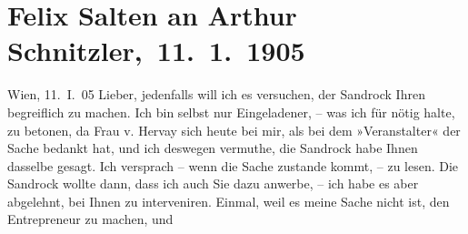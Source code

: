 

         
         \renewcommand{\erwaehntePersonen}{Personen: Elvira Leontine Hervay von Kirchberg, Adele Sandrock}
         \renewcommand{\erwaehnteOrte}{Orte: Wien}
         \renewcommand{\erwaehnteWerke}{}
               \section[ Felix Salten an Arthur Schnitzler, 11. 1. 1905]{ Felix Salten an Arthur Schnitzler, 11. 1. 1905}\nopagebreak{}\rehead{ }\begin{ledgroupsized}[t]{13cm}\normalsize\beginnumbering \toendnotes[C]{\smallbreak\pagebreak[2]} 
\toendnotes[C]{\smallbreak}\pstart
           \raggedleft{}{\pb}Wien, 11. I. 05\pend
           \pstart
           Lieber, jedenfalls will ich es versuchen, der Sandrock Ihren \label{K_L03405-1v}\label{K_L03405-1h} begreiflich zu machen. Ich bin selbst nur Eingeladener, – was ich für nötig
               halte, zu betonen, da Frau v. Hervay sich heute bei mir, als bei dem »Veranstalter« der Sache
               bedankt hat, und ich deswegen vermuthe, die Sandrock habe Ihnen dasselbe gesagt. Ich versprach – wenn die Sache zustande
               kommt, – zu lesen. Die Sandrock wollte dann,
               dass ich auch Sie dazu anwerbe, – ich habe es aber abgelehnt, bei Ihnen zu
               interveniren. Einmal, weil es meine Sache nicht ist, den Entrepreneur zu machen, und

\end{ledgroupsized}
